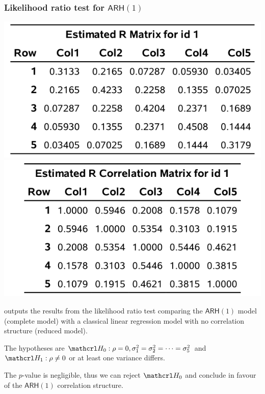 \documentclass{beamer}
\begin{document}
\begin{frame}[fragile]
\frametitle{Likelihood ratio test for $\mathsf{ARH}(1)$}
\begin{center}
\includegraphics[width = 0.45\linewidth]{img/c5/slides6-e21a}
\includegraphics[width = 0.45\linewidth]{img/c5/slides6-e21b}
\end{center}
\bi
\item \SASlang{} outputs the results from the likelihood ratio test comparing the $\mathsf{ARH}(1)$ model (complete model) with a classical linear regression model with no correlation structure (reduced model).
\item The hypotheses are $\Hy_0: \rho=0, \sigma_1^2=\sigma_2^2=\cdots=\sigma_5^2$ and  $\Hy_1: \rho \neq 0$ or at least one variance differs.
\item The $p$-value is negligible, thus we can reject $\Hy_0$ and conclude in favour of the $\mathsf{ARH}(1)$ correlation structure.
\ei
\end{frame}
\end{document}
